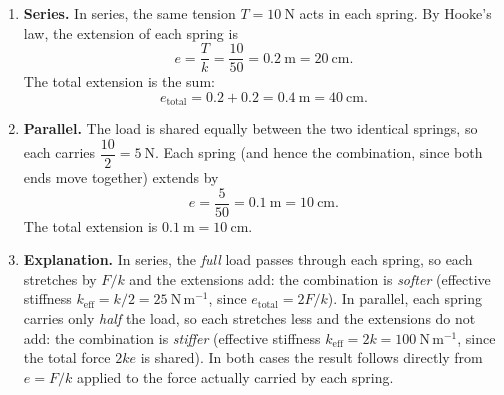 \documentclass[11pt]{article}
\begin{document}
\begin{corrige}
\begin{enumerate}
\item \textbf{Series.} In series, the same tension $T=10\ \mathrm{N}$ acts in each spring. By Hooke's law, the extension of each spring is
\[
e=\frac{T}{k}=\frac{10}{50}=0.2\ \mathrm{m}=20\ \mathrm{cm}.
\]
The total extension is the sum:
\[
e_{\text{total}}=0.2+0.2=0.4\ \mathrm{m}=40\ \mathrm{cm}.
\]
\item \textbf{Parallel.} The load is shared equally between the two identical springs, so each carries $\dfrac{10}{2}=5\ \mathrm{N}$. Each spring (and hence the combination, since both ends move together) extends by
\[
e=\frac{5}{50}=0.1\ \mathrm{m}=10\ \mathrm{cm}.
\]
The total extension is $0.1\ \mathrm{m}=10\ \mathrm{cm}$.
\item \textbf{Explanation.} In series, the \emph{full} load passes through each spring, so each stretches by $F/k$ and the extensions add: the combination is \emph{softer} (effective stiffness $k_{\text{eff}}=k/2=25\ \mathrm{N\,m^{-1}}$, since $e_{\text{total}}=2F/k$). In parallel, each spring carries only \emph{half} the load, so each stretches less and the extensions do not add: the combination is \emph{stiffer} (effective stiffness $k_{\text{eff}}=2k=100\ \mathrm{N\,m^{-1}}$, since the total force $2ke$ is shared). In both cases the result follows directly from $e=F/k$ applied to the force actually carried by each spring.
\end{enumerate}
\end{corrige}
\end{document}
